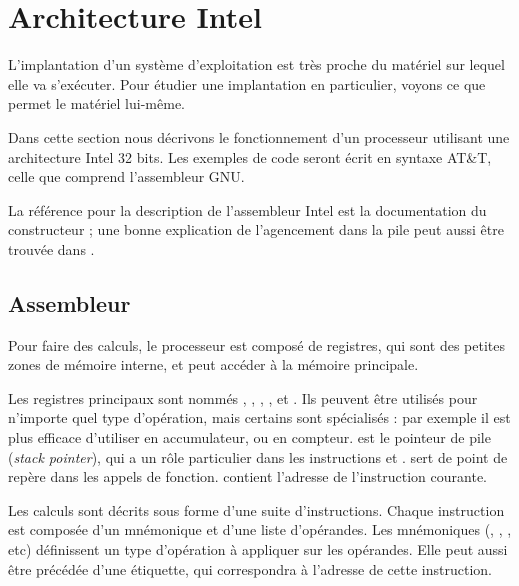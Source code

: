 \section{Architecture Intel}

L'implantation d'un système d'exploitation est très proche du matériel sur
lequel elle va s'exécuter. Pour étudier une implantation en particulier, voyons
ce que permet le matériel lui-même.

Dans cette section nous décrivons le fonctionnement d'un processeur utilisant
une architecture Intel 32 bits. Les exemples de code seront écrit en syntaxe
AT\&T, celle que comprend l'assembleur GNU.

La référence pour la description de l'assembleur Intel est la documentation du
constructeur \cite{intelsys} ; une bonne explication de l'agencement dans la
pile peut aussi être trouvée dans \cite{SmashingTheStack}.

\subsection{Assembleur}

Pour faire des calculs, le processeur est composé de registres, qui sont des
petites zones de mémoire interne, et peut accéder à la mémoire principale.

Les registres principaux sont nommés \eax, \ebx, \ecx, \edx, \esi et \edi. Ils
peuvent être utilisés pour n'importe quel type d'opération, mais certains sont
spécialisés : par exemple il est plus efficace d'utiliser \eax en accumulateur,
ou \ecx en compteur. \esp est le pointeur de pile (\emph{stack pointer}), qui a
un rôle particulier dans les instructions  et .
\ebp sert de point de repère dans les appels de fonction. \eip contient
l'adresse de l'instruction courante.

Les calculs sont décrits sous forme d'une suite d'instructions. Chaque
instruction est composée d'un mnémonique et d'une liste d'opérandes. Les
mnémoniques (, , , etc) définissent
un type d'opération à appliquer sur les opérandes. Elle peut aussi être précédée
d'une étiquette, qui correspondra à l'adresse de cette instruction.

